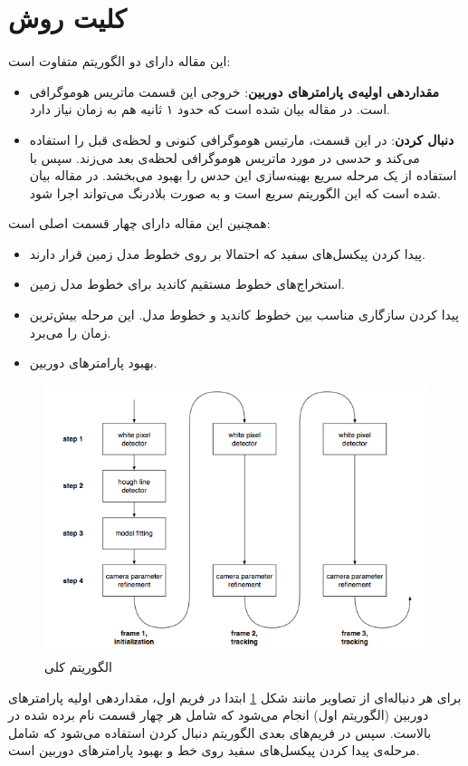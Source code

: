 \documentclass{report}
\begin{document}
\section{کلیت روش}
این مقاله دارای دو الگوریتم متفاوت است:
\begin{itemize}
\item
\textbf{مقداردهی اولیه‌ی پارامترهای دوربین}: خروجی این قسمت ماتریس هوموگرافی است. در مقاله بیان شده است که حدود ۱ ثانیه هم به زمان نیاز دارد.
\item
\textbf{دنبال کردن}: در این قسمت، مارتیس هوموگرافی کنونی و لحظه‌ی قبل را استفاده می‌کند و حدسی در مورد ماتریس هوموگرافی لحظه‌ی بعد می‌زند. سپس با استفاده از یک مرحله سریع بهینه‌سازی این حدس را بهبود می‌بخشد. در مقاله بیان شده است که این الگوریتم سریع است و به صورت بلادرنگ می‌تواند اجرا شود.
\end{itemize}
همچنین این مقاله دارای چهار قسمت اصلی است:
\begin{itemize}
\item
پیدا کردن پیکسل‌های سفید که احتمالا بر روی خطوط مدل زمین قرار دارند.
\item
استخراج‌های خطوط مستقیم کاندید برای خطوط مدل زمین.
\item
پیدا کردن سازگاری مناسب بین خطوط کاندید و خطوط مدل. این مرحله بیش‌ترین زمان را می‌برد.
\item
بهبود پارامترهای دوربین.
\end{itemize}
\begin{figure}
\centering
\includegraphics[scale=0.5]{steps.png}
\caption{الگوریتم کلی}
\label{overview}
\end{figure}
برای هر دنباله‌ای از تصاویر مانند شکل \ref{overview} ابتدا در فریم اول، مقداردهی اولیه پارامترهای دوربین (الگوریتم اول) انجام می‌شود که شامل هر چهار قسمت نام برده شده در بالاست. سپس در فریم‌های بعدی الگوریتم دنبال کردن استفاده می‌شود که شامل مرحله‌ی پیدا کردن پیکسل‌های سفید روی خط و بهبود پارامترهای دوربین است.
\end{document}
